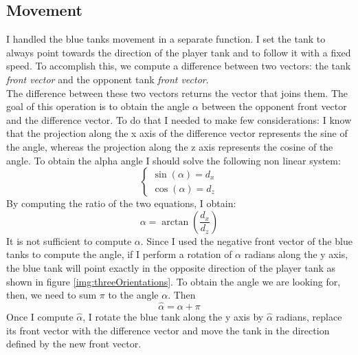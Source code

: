 \documentclass[14pt]{article}
\begin{document}
\subsection{Movement}
I handled the blue tanks movement in a separate function. I set the tank to always point towards the direction of the player tank and to follow it with a fixed speed. To accomplish this, we compute a difference between two vectors: the tank \textit{front vector} and the opponent tank \textit{front vector}. \\
The difference between these two vectors returns the vector that joins them. The goal of this operation is to obtain the angle \(\alpha\) between the opponent front vector and the difference vector. To do that I needed to make few considerations: I know that the projection along the x axis of the difference vector represents the sine of the angle, whereas the projection along the z axis represents the cosine of the angle. To obtain the alpha angle I should solve the following non linear system:
\begin{equation}\label{eq:followTank}
\begin{cases}
\sin(\alpha) = d_{x}\\
\cos(\alpha) = d_{z}
\end{cases}
\end{equation}
By computing the ratio of the two equations, I obtain: 
\begin{equation}\label{eq:alpha}
\alpha = \arctan\left(\frac{d_{x}}{d_{z}}\right)
\end{equation}
It is not sufficient to compute \(\alpha\). Since I used the negative front vector of the blue tanks to compute the angle, if I perform a rotation of \(\alpha\) radians along the y axis, the blue tank will point exactly in the opposite direction of the player tank as shown in figure  \ref{img:threeOrientations}. To obtain the angle we are looking for, then, we need to sum \(\pi\) to the angle \(\alpha\). Then \[\hat{\alpha} = \alpha + \pi\]
Once I compute \(\hat{\alpha}\), I rotate the blue tank along the y axis by \(\hat{\alpha}\) radians, replace its front vector with the difference vector and move the tank in the direction defined by the new front vector.\\
\end{document}
